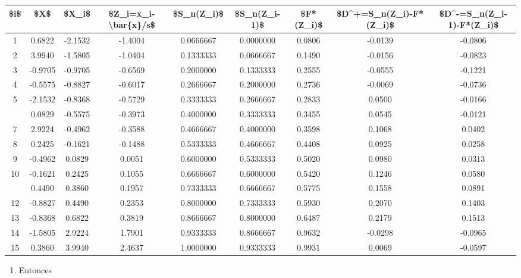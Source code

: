 \documentclass[a4paper,oneside,openany]{book}
\providecommand{\tightlist}{%
  \setlength{\itemsep}{0pt}\setlength{\parskip}{0pt}}
\begin{document}
\begin{table}[H]
\centering
\begin{tabular}{ccccccccc}
\toprule
\$i\$ & \$X\$ & \$X\_i\$ & \$Z\_i=x\_i-\textbackslash{}bar\{x\}/s\$ & \$S\_n(Z\_i)\$ & \$S\_n(Z\_i-1)\$ & \$F*(Z\_i)\$ & \$D\textasciicircum{}+=S\_n(Z\_i)-F*(Z\_i)\$ & \$D\textasciicircum{}-=S\_n(Z\_i-1)-F*(Z\_i)\$\\
\midrule
1 & 0.6822 & -2.1532 & -1.4004 & 0.0666667 & 0.0000000 & 0.0806 & -0.0139 & -0.0806\\
2 & 3.9940 & -1.5805 & -1.0404 & 0.1333333 & 0.0666667 & 0.1490 & -0.0156 & -0.0823\\
3 & -0.9705 & -0.9705 & -0.6569 & 0.2000000 & 0.1333333 & 0.2555 & -0.0555 & -0.1221\\
4 & -0.5575 & -0.8827 & -0.6017 & 0.2666667 & 0.2000000 & 0.2736 & -0.0069 & -0.0736\\
5 & -2.1532 & -0.8368 & -0.5729 & 0.3333333 & 0.2666667 & 0.2833 & 0.0500 & -0.0166\\
\addlinespace
6 & 0.0829 & -0.5575 & -0.3973 & 0.4000000 & 0.3333333 & 0.3455 & 0.0545 & -0.0121\\
7 & 2.9224 & -0.4962 & -0.3588 & 0.4666667 & 0.4000000 & 0.3598 & 0.1068 & 0.0402\\
8 & 0.2425 & -0.1621 & -0.1488 & 0.5333333 & 0.4666667 & 0.4408 & 0.0925 & 0.0258\\
9 & -0.4962 & 0.0829 & 0.0051 & 0.6000000 & 0.5333333 & 0.5020 & 0.0980 & 0.0313\\
10 & -0.1621 & 0.2425 & 0.1055 & 0.6666667 & 0.6000000 & 0.5420 & 0.1246 & 0.0580\\
\addlinespace
11 & 0.4490 & 0.3860 & 0.1957 & 0.7333333 & 0.6666667 & 0.5775 & 0.1558 & 0.0891\\
12 & -0.8827 & 0.4490 & 0.2353 & 0.8000000 & 0.7333333 & 0.5930 & 0.2070 & 0.1403\\
13 & -0.8368 & 0.6822 & 0.3819 & 0.8666667 & 0.8000000 & 0.6487 & 0.2179 & 0.1513\\
14 & -1.5805 & 2.9224 & 1.7901 & 0.9333333 & 0.8666667 & 0.9632 & -0.0298 & -0.0965\\
15 & 0.3860 & 3.9940 & 2.4637 & 1.0000000 & 0.9333333 & 0.9931 & 0.0069 & -0.0597\\
\bottomrule
\end{tabular}
\end{table}

\begin{enumerate}
\def\labelenumi{\arabic{enumi})}
\setcounter{enumi}{8}
\tightlist
\item
  Entonces
\end{enumerate}
\end{document}

